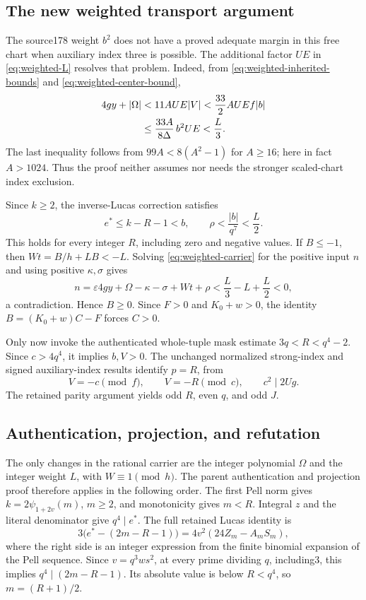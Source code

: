 \subsection{The new weighted transport argument}

The source178 weight $b^2$ does not have a proved adequate margin in this free
chart when auxiliary index three is possible. The additional factor $UE$ in
\eqref{eq:weighted-L} resolves that problem. Indeed, from
\eqref{eq:weighted-inherited-bounds} and
\eqref{eq:weighted-center-bound},
\begin{align}
 4gy+|\Omega|
 &<11AUE|V|
 <\frac{33}{2}AUEf|b|\notag\\
 &\le\frac{33A}{8\Delta}\,b^2UE
 <\frac L3.\label{eq:weighted-margin}
\end{align}
The last inequality follows from $99A<8(A^2-1)$ for $A\ge16$; here in fact
$A>1024$. Thus the proof neither assumes nor needs the stronger scaled-chart
index exclusion.

Since $k\ge2$, the inverse-Lucas correction satisfies
\[
 e^*\le k-R-1<b,
 \qquad \rho<\frac{|b|}{q^7}<\frac L2.
\]
This holds for every integer $R$, including zero and negative values.
If $B\le-1$, then $Wt=B/h+LB<-L$. Solving
\eqref{eq:weighted-carrier} for the positive input $n$ and using positive
$\kappa,\sigma$ gives
\[
 n=\varepsilon4gy+\Omega-\kappa-\sigma+Wt+\rho
 <\frac L3-L+\frac L2<0,
\]
a contradiction. Hence $B\ge0$. Since $F>0$ and $K_0+w>0$, the identity
$B=(K_0+w)C-F$ forces $C>0$.

Only now invoke the authenticated whole-tuple mask estimate
$3q<R<q^4-2$. Since $c>4q^4$, it implies $b,V>0$. The unchanged normalized
strong-index and signed auxiliary-index results identify $p=R$, from
\[
 V=-c\pmod f,\qquad V=-R\pmod c,\qquad c^2\mid2Ug.
\]
The retained parity argument yields odd $R$, even $q$, and odd $J$.

\subsection{Authentication, projection, and refutation}

The only changes in the rational carrier are the integer polynomial
$\Omega$ and the integer weight $L$, with $W\equiv1\pmod h$. The parent
authentication and projection proof therefore applies in the following order.
The first Pell norm gives $k=2\psi_{1+2v}(m)$, $m\ge2$, and monotonicity gives
$m<R$. Integral $z$ and the literal denominator give $q^4\mid e^*$.
The full retained Lucas identity is
\[
 3\bigl(e^*-(2m-R-1)\bigr)
   =4v^2(24Z_m-A_mS_m),
\]
where the right side is an integer expression from the finite binomial
expansion of the Pell sequence. Since $v=q^3ws^2$, at every prime dividing
$q$, including3, this implies $q^4\mid(2m-R-1)$. Its absolute value is below
$R<q^4$, so $m=(R+1)/2$.

